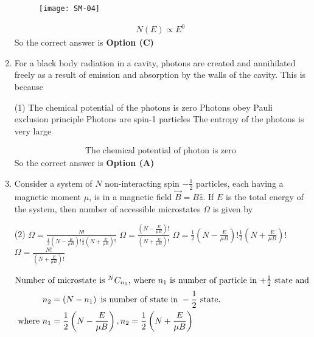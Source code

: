 \begin{enumerate}
\begin{tasks}
\begin{figure}[H]
	\centering
	\texttt{[image: SM-04]}
\end{figure}
\end{tasks}
\begin{answer}
\begin{align*}
N(E) \propto E^{0}
\end{align*}
So the correct answer is \textbf{Option (C)}
\end{answer}
	\item For a black body radiation in a cavity, photons are created and annihilated freely as a result of emission and absorption by the walls of the cavity. This is because
\begin{tasks}(1)
\task[\textbf{A.}] The chemical potential of the photons is zero
\task[\textbf{B.}] Photons obey Pauli exclusion principle
\task[\textbf{C.}] Photons are spin-1 particles
\task[\textbf{D.}] The entropy of the photons is very large
\end{tasks}
\begin{answer}
\begin{align*}
\text{The chemical potential of photon is zero}
\end{align*}
So the correct answer is \textbf{Option (A)}
\end{answer}
	\item Consider a system of $N$ non-interacting spin $-\frac{1}{2}$ particles, each having a magnetic moment $\mu$, is in a magnetic field $\vec{B}=B \hat{z} .$ If $E$ is the total energy of the system, then number of accessible microstates $\Omega$ is given by
\begin{tasks}(2)
\task[\textbf{A.}] $\Omega=\frac{N !}{\frac{1}{2}\left(N-\frac{E}{\mu B}\right) ! \frac{1}{2}\left(N+\frac{E}{\mu B}\right) !}$
\task[\textbf{B.}] $\Omega=\frac{\left(N-\frac{E}{\mu B}\right) !}{\left(N+\frac{E}{\mu B}\right) !}$
\task[\textbf{C.}] $\Omega=\frac{1}{2}\left(N-\frac{E}{\mu B}\right) ! \frac{1}{2}\left(N+\frac{E}{\mu B}\right) !$
\task[\textbf{D.}] $\Omega=\frac{N !}{\left(N+\frac{E}{\mu B}\right) !}$
\end{tasks}
\begin{answer}
\begin{align*}
\intertext{Number of microstate is ${ }^{N} C_{n_{1}}$, where $n_{1}$ is number of particle in $+\frac{1}{2}$ state and}
n_{2}&=\left(N-n_{1}\right)\text{ is number of state in }-\frac{1}{2}\text{ state.}\\
\text{	where }n_{1}&=\frac{1}{2}\left(N-\frac{E}{\mu B}\right), n_{2}=\frac{1}{2}\left(N+\frac{E}{\mu B}\right)\\

\end{align*}
\end{answer}
\end{enumerate}
